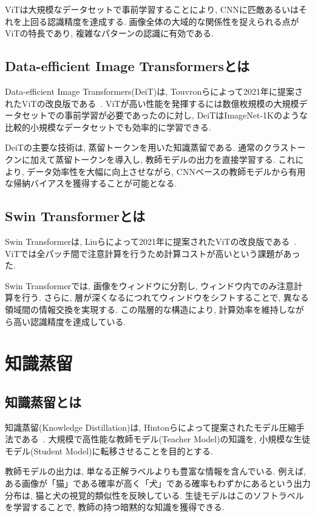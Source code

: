 ViTは大規模なデータセットで事前学習することにより, CNNに匹敵あるいはそれを上回る認識精度を達成する. 
画像全体の大域的な関係性を捉えられる点がViTの特長であり, 複雑なパターンの認識に有効である.

\subsection{Data-efficient Image Transformersとは}
Data-efficient Image Transformers(DeiT)は, Touvronらによって2021年に提案されたViTの改良版である~\cite{touvron2021deit}.
ViTが高い性能を発揮するには数億枚規模の大規模データセットでの事前学習が必要であったのに対し, DeiTはImageNet-1Kのような比較的小規模なデータセットでも効率的に学習できる.

DeiTの主要な技術は, 蒸留トークンを用いた知識蒸留である. 
通常のクラストークンに加えて蒸留トークンを導入し, 教師モデルの出力を直接学習する. 
これにより, データ効率性を大幅に向上させながら, CNNベースの教師モデルから有用な帰納バイアスを獲得することが可能となる.

\subsection{Swin Transformerとは}

Swin Transformerは, Liuらによって2021年に提案されたViTの改良版である~\cite{liu2021swin}. 
ViTでは全パッチ間で注意計算を行うため計算コストが高いという課題があった.

Swin Transformerでは, 画像をウィンドウに分割し, ウィンドウ内でのみ注意計算を行う. 
さらに, 層が深くなるにつれてウィンドウをシフトすることで, 異なる領域間の情報交換を実現する. 
この階層的な構造により, 計算効率を維持しながら高い認識精度を達成している.

\section{知識蒸留}

\subsection{知識蒸留とは}

知識蒸留(Knowledge Distillation)は, Hintonらによって提案されたモデル圧縮手法である~\cite{hinton2015distilling}. 
大規模で高性能な教師モデル(Teacher Model)の知識を, 小規模な生徒モデル(Student Model)に転移させることを目的とする.

教師モデルの出力は, 単なる正解ラベルよりも豊富な情報を含んでいる. 
例えば, ある画像が「猫」である確率が高く「犬」である確率もわずかにあるという出力分布は, 猫と犬の視覚的類似性を反映している. 
生徒モデルはこのソフトラベルを学習することで, 教師の持つ暗黙的な知識を獲得できる.

